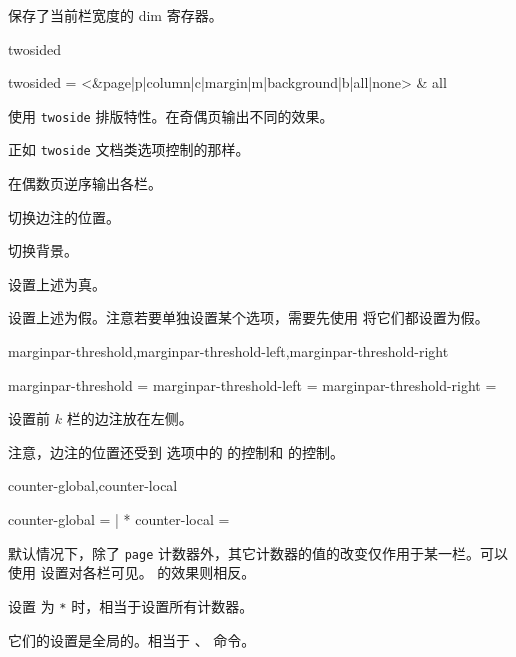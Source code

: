 \documentclass{cusdoc}
\begin{document}
\begin{function}[module=paracol]{\columnwidth}
保存了当前栏宽度的 dim 寄存器。
\end{function}

\begin{keyval}[path=paracol]{twosided}
  \begin{syntax}
    twosided = <&page|p|column|c|margin|m|background|b|all|none> & all 
  \end{syntax}
使用 \texttt{twoside} 排版特性。在奇偶页输出不同的效果。

\begin{description}[nosep]
  \item[\texttt{page|p}] 正如 \texttt{twoside} 文档类选项控制的那样。
  \item[\texttt{column|c}] 在偶数页逆序输出各栏。
  \item[\texttt{margin|m}] 切换边注的位置。
  \item[\texttt{background|b}] 切换背景。
  \item[\texttt{all}] 设置上述为真。
  \item[\texttt{none}] 设置上述为假。注意若要单独设置某个选项，需要先使用  将它们都设置为假。
\end{description}
\end{keyval}

\begin{keyval}[path=paracol]{marginpar-threshold,marginpar-threshold-left,marginpar-threshold-right}
  \begin{syntax}
    marginpar-threshold       =  
    marginpar-threshold-left  = 
    marginpar-threshold-right = 
  \end{syntax}
设置前 $k$ 栏的边注放在左侧。

注意，边注的位置还受到  选项中的  的控制和  的控制。
\end{keyval}

\begin{keyval}[path=paracol]{counter-global,counter-local}
  \begin{syntax}
    counter-global =  | *
    counter-local  = 
  \end{syntax}
默认情况下，除了 \texttt{page} 计数器外，其它计数器的值的改变仅作用于某一栏。可以使用  设置对各栏可见。 的效果则相反。

设置  为 \texttt{*} 时，相当于设置所有计数器。

它们的设置是全局的。相当于 、 命令。
\end{keyval}
\end{document}
